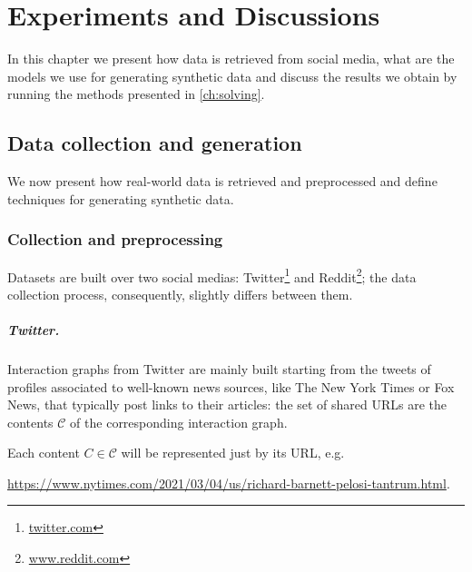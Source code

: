 \chapter{Experiments and Discussions}
\label{ch:resultsAndAnalysis}

In this chapter we present how data is retrieved from social media,
what are the models we use for generating synthetic data and discuss the
results we obtain by running the methods presented in
\autoref{ch:solving}.

\section{Data collection and generation}%
\label{sec:data_collection_and_generation}

We now present how real-world data is retrieved and preprocessed and
define techniques for generating synthetic data.

\subsection{Collection and preprocessing}%
\label{sub:collection_and_preprocessing}

Datasets are built over two social medias:
Twitter\footnote{\url{twitter.com}} and Reddit\footnote{\url{www.reddit.com}}; the data
collection process, consequently, slightly differs between them.

\paragraph{Twitter.}%
\label{par:twitter-data}

Interaction graphs from Twitter are mainly built starting from the tweets
of profiles associated to well-known news sources, like The
New York Times or Fox News, that typically post links to their articles:
the set of shared URLs are the contents $\mathcal{C} $ of the corresponding interaction graph.


Each content $C \in \mathcal{C}$ will be represented just by its URL,
e.g.

	{\footnotesize
		\begin{center}
			\url{https://www.nytimes.com/2021/03/04/us/richard-barnett-pelosi-tantrum.html}.
		\end{center}
	}


